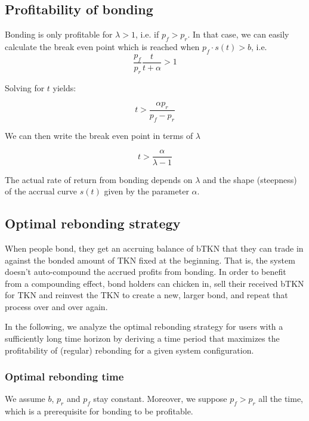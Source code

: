 \documentclass{article}
\begin{document}
\subsection{Profitability of bonding}
Bonding is only profitable for $\lambda>1$, i.e. if $p_f>p_r$. In that case, we can easily calculate the break even point which is reached when $p_f \cdot s(t)>b$, i.e.
\begin{equation}
  \label{eq:break_even_0}
\frac{p_f}{p_r}\frac{t}{t+\alpha} > 1
\end{equation}

Solving for $t$ yields:

\begin{equation}
  \label{eq:break_even_1}
t > \frac{\alpha p_r}{p_f-p_r}
\end{equation}

We can then write the break even point in terms of $\lambda$

\begin{equation}
  \label{eq:break_even_2}
t > \frac{\alpha}{\lambda-1}
\end{equation}

The actual rate of return from bonding depends on $\lambda$ and the shape (steepness) of the accrual curve $s(t)$ given by the parameter $\alpha$.

\subsection{Optimal rebonding strategy}
When people bond, they get an accruing balance of bTKN that they can trade in against the bonded amount of TKN fixed at the beginning. That is, the system doesn't auto-compound the accrued profits from bonding. In order to benefit from a compounding effect, bond holders can chicken in, sell their received bTKN for TKN and reinvest the TKN to create a new, larger bond, and repeat that process over and over again.

In the following, we analyze the optimal rebonding strategy for users with a sufficiently long time horizon by deriving a time period that maximizes the profitability of (regular) rebonding for a given system configuration.

\subsubsection{Optimal rebonding time}
  \label{sec:T_OP}
We assume $b$, $p_r$ and $p_f$ stay constant. Moreover, we suppose $p_f>p_r$ all the time, which is a prerequisite for bonding to be profitable. 
\end{document}
